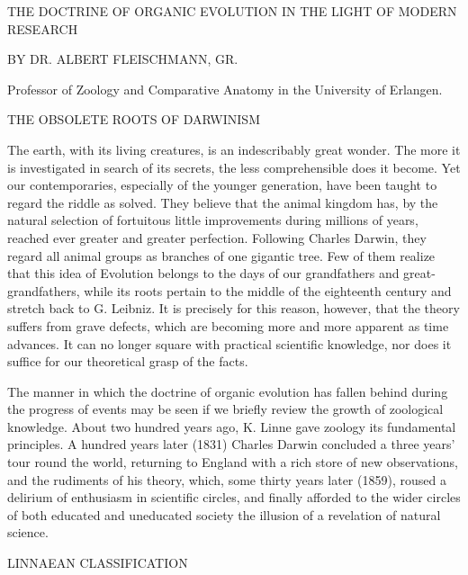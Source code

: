 THE DOCTRINE OF ORGANIC EVOLUTION IN THE LIGHT OF MODERN
RESEARCH

BY DR. ALBERT FLEISCHMANN, GR.

Professor of Zoology and Comparative Anatomy in the University of Erlangen.

THE OBSOLETE ROOTS OF DARWINISM

The earth, with its living creatures, is an indescribably great wonder. The more it is
investigated in search of its secrets, the less comprehensible does it become. Yet our
contemporaries, especially of the younger generation, have been taught to regard the riddle as
solved. They believe that the animal kingdom has, by the natural selection of fortuitous little
improvements during millions of years, reached ever greater and greater perfection.
Following Charles Darwin, they regard all animal groups as branches of one gigantic tree.
Few of them realize that this idea of Evolution belongs to the days of our grandfathers and
great-grandfathers, while its roots pertain to the middle of the eighteenth century and stretch
back to G. Leibniz. It is precisely for this reason, however, that the theory suffers from grave
defects, which are becoming more and more apparent as time advances. It can no longer
square with practical scientific knowledge, nor does it suffice for our theoretical grasp of the
facts.

The manner in which the doctrine of organic evolution has fallen behind during the progress
of events may be seen if we briefly review the growth of zoological knowledge. About two
hundred years ago, K. Linne gave zoology its fundamental principles. A hundred years later
(1831) Charles Darwin concluded a three years' tour round the world, returning to England
with a rich store of new observations, and the rudiments of his theory, which, some thirty
years later (1859), roused a delirium of enthusiasm in scientific circles, and finally afforded
to the wider circles of both educated and uneducated society the illusion of a revelation of
natural science.

LINNAEAN CLASSIFICATION

